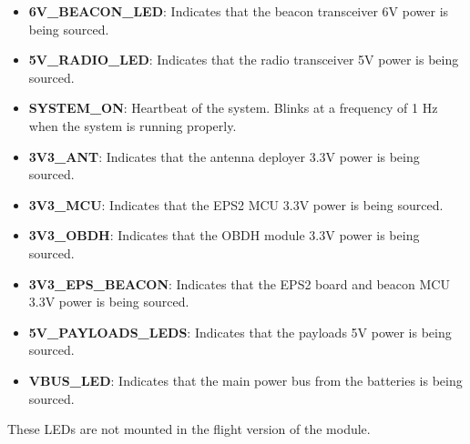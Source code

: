 \begin{itemize}
    \item \textbf{6V\_BEACON\_LED}: Indicates that the beacon transceiver 6V power is being sourced.
    \item \textbf{5V\_RADIO\_LED}: Indicates that the radio transceiver 5V power is being sourced.
    \item \textbf{SYSTEM\_ON}: Heartbeat of the system. Blinks at a frequency of 1 Hz when the system is running properly.
    \item \textbf{3V3\_ANT}: Indicates that the antenna deployer 3.3V power is being sourced.
    \item \textbf{3V3\_MCU}: Indicates that the EPS2 MCU 3.3V power is being sourced.
    \item \textbf{3V3\_OBDH}: Indicates that the OBDH module 3.3V power is being sourced.
    \item \textbf{3V3\_EPS\_BEACON}: Indicates that the EPS2 board and beacon MCU 3.3V power is being sourced.
    \item \textbf{5V\_PAYLOADS\_LEDS}: Indicates that the payloads 5V power is being sourced.
    \item \textbf{VBUS\_LED}: Indicates that the main power bus from the batteries is being sourced.
\end{itemize}

These LEDs are not mounted in the flight version of the module.